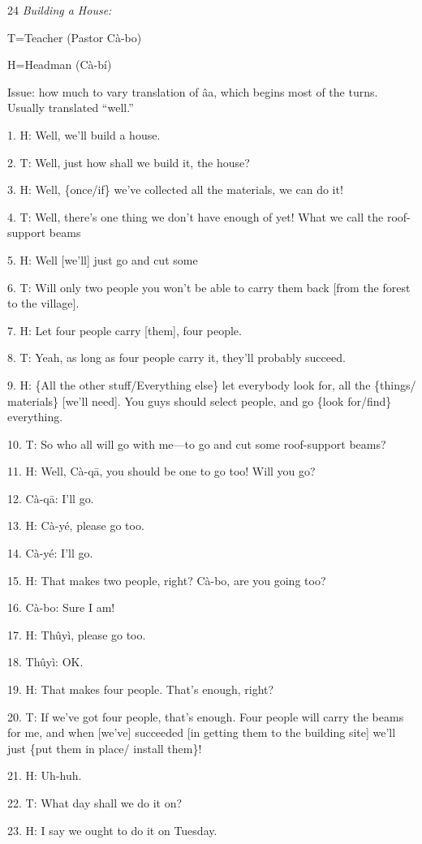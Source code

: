 
24\textit{ Building a House:}

T=Teacher (Pastor Cà-bo)

H=Headman (Cà-bí)

Issue: how much to vary translation of âa, which begins most of the turns.  Usually
translated ``well.''

1. H: Well, we'll build a house.

2. T: Well, just how shall we build it, the house?

3. H: Well, \{once/if\} we've collected all the materials, we can do it!

4. T: Well, there's one thing we don't have enough of yet!  What we call the roof-support
beams

5. H: Well [we'll] just go and cut some

6. T: Will only two people you won't be able to carry them back [from the forest
to the village].

7. H: Let four people carry [them], four people.

8. T: Yeah, as long as four people carry it, they'll probably succeed.

9. H: \{All the other stuff/Everything else\} let everybody look for, all the \{things/
materials\} [we'll need].  You guys should select people, and go \{look for/find\}
everything.

10. T: So who all will go with me---to go and cut some roof-support beams?

11. H: Well, Cà-qā, you should be one to go too!  Will you go?

12. Cà-qā: I'll go.

13. H: Cà-yé, please go too.

14. Cà-yé: I'll go.

15. H: That makes two people, right? Cà-bo, are you going too?

16. Cà-bo: Sure I am!

17. H: Thûyì, please go too.

18. Thûyì: OK.

19. H: That makes four people.  That's enough, right?

20. T: If we've got four people, that's enough.  Four people will carry the beams
for me, and when [we've] succeeded [in getting them to the building site] we'll
just \{put them in place/ install them\}!

21. H: Uh-huh.

22. T: What day shall we do it on?

23. H: I say we ought to do it on Tuesday.

